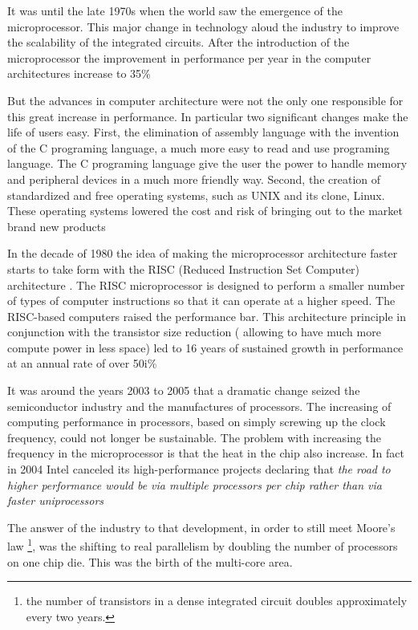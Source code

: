 It was until the late 1970s  when the world saw the emergence of the
microprocessor. This major change in technology aloud the industry to improve
the scalability of the integrated circuits. After the introduction of the
microprocessor the improvement in performance per year in the computer
architectures increase to 35\% \cite{Henesy}   

But the advances in computer architecture were not the only one responsible for
this great increase in performance. In particular two significant changes make
the life of users easy. First, the elimination of assembly language with the
invention of the C programing language, a much more easy to read and use
programing language. The C programing language give the user the power to
handle memory and peripheral devices in a much more friendly way. Second, the
creation of standardized and free  operating systems, such as UNIX and its
clone, Linux. These operating systems lowered the cost and risk of bringing out
to the market brand new products

In the decade of 1980 the idea of making the microprocessor architecture faster
starts to take form with the RISC (Reduced Instruction Set Computer)
architecture .  The RISC microprocessor is designed to perform a smaller number
of types of computer instructions so that it can operate at a higher speed. 
The RISC-based computers raised the performance bar. This architecture
principle in conjunction with the transistor size reduction ( allowing to have
much more compute power in less space) led to 16 years of sustained growth in
performance at an annual rate of over 50i\%

It was around the years 2003 to 2005 that a dramatic change seized the
semiconductor industry and the manufactures of processors. The increasing of
computing performance in processors, based on simply screwing up the clock
frequency, could not longer be sustainable. The problem with increasing the
frequency in the microprocessor is that the heat in the chip also increase.  In
fact in 2004 Intel canceled its high-performance projects declaring that
\textit{the road to higher performance would be via multiple processors per
chip rather than via faster uniprocessors}

The answer of the industry to that development, in order to still meet Moore's
law \footnote{the number of transistors in a dense integrated circuit doubles
approximately every two years.}, was the shifting to real parallelism by
doubling the number of processors on one chip die. This was the birth of the
multi-core area. 

